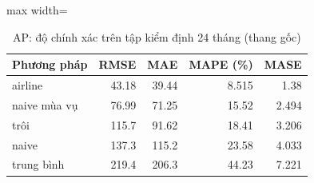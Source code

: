\begin{table}[H]
\centering\small
\caption{AP: độ chính xác trên tập kiểm định 24 tháng (thang gốc)}\label{tab:tab_b12_11_ap_benchmarks}
\begin{adjustbox}{max width=\linewidth}
\begin{tabular}{lrrrr}
\toprule
Phương pháp & RMSE & MAE & MAPE (\%) & MASE \\
\midrule
airline & 43.18 & 39.44 & 8.515 & 1.38 \\
naive mùa vụ & 76.99 & 71.25 & 15.52 & 2.494 \\
trôi & 115.7 & 91.62 & 18.41 & 3.206 \\
naive & 137.3 & 115.2 & 23.58 & 4.033 \\
trung bình & 219.4 & 206.3 & 44.23 & 7.221 \\
\bottomrule
\end{tabular}
\end{adjustbox}\par{}
\end{table}
